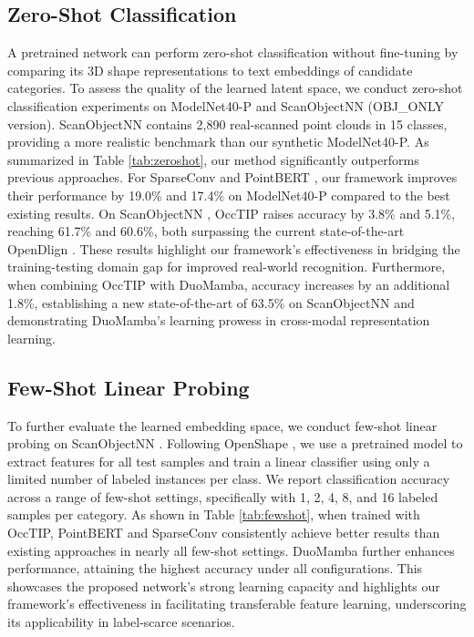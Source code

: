 \subsection{Zero-Shot Classification}

A pretrained network can perform zero-shot classification without fine-tuning by comparing its 3D shape representations to text embeddings of candidate categories. To assess the quality of the learned latent space, we conduct zero-shot classification experiments on ModelNet40-P and ScanObjectNN \cite{scanobjectnn} (OBJ\_ONLY version). ScanObjectNN \cite{scanobjectnn} contains 2,890 real-scanned point clouds in 15 classes, providing a more realistic benchmark than our synthetic ModelNet40-P. 
As summarized in Table \ref{tab:zeroshot}, our method significantly outperforms previous approaches. For SparseConv \cite{sparseconv} and PointBERT \cite{pointbert}, our framework improves their performance by 19.0\% and 17.4\% on ModelNet40-P compared to the best existing results. On ScanObjectNN \cite{scanobjectnn}, OccTIP raises accuracy by 3.8\% and 5.1\%, reaching 61.7\% and 60.6\%, both surpassing the current state-of-the-art OpenDlign \cite{opendlign}. These results highlight our framework's effectiveness in bridging the training-testing domain gap for improved real-world recognition. Furthermore, when combining OccTIP with DuoMamba, accuracy increases by an additional 1.8\%, establishing a new state-of-the-art of 63.5\% on ScanObjectNN \cite{scanobjectnn} and demonstrating DuoMamba's learning prowess in cross-modal representation learning.
\subsection{Few-Shot Linear Probing}
\label{main_exp_fewshot}
To further evaluate the learned embedding space, we conduct few-shot linear probing on ScanObjectNN \cite{scanobjectnn}. Following OpenShape \cite{openshape}, we use a pretrained model to extract features for all test samples and train a linear classifier using only a limited number of labeled instances per class. We report classification accuracy across a range of few-shot settings, specifically with 1, 2, 4, 8, and 16 labeled samples per category. As shown in Table \ref{tab:fewshot}, when trained with OccTIP, PointBERT \cite{pointbert} and SparseConv \cite{sparseconv} consistently achieve better results than existing approaches in nearly all few-shot settings. DuoMamba further enhances performance, attaining the highest accuracy under all configurations.  
This showcases the proposed network's strong learning capacity and highlights our framework's effectiveness in facilitating transferable feature learning, underscoring its applicability in label-scarce scenarios.
